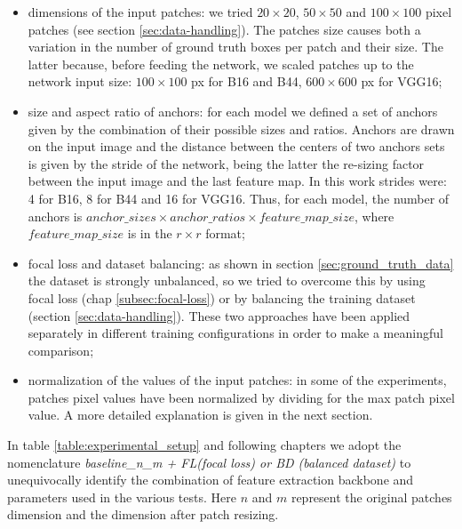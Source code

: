 \documentclass[a4paper,10pt]{report}
\begin{document}
\begin{itemize}
    \item dimensions of the input patches: we tried $20 \times 20$, $50 \times 50$ and $100 \times 100$ pixel patches (see section \ref{sec:data-handling}). The patches size causes both a variation in the number of ground truth boxes per patch and their size. The latter because, before feeding the network, we scaled patches up to the network input size: $100 \times 100 $ px for B16 and B44, $ 600 \times 600$ px for VGG16;
    \item size and aspect ratio of anchors: for each model we defined a set of anchors given by the combination of their possible sizes and ratios. Anchors are drawn on the input image and the distance between the centers of two anchors sets is given by the stride of the network, being the latter the re-sizing factor between the input image and the last feature map. In this work strides were: 4 for B16, 8 for B44 and 16 for VGG16. Thus, for each model, the number of anchors is $anchor\_sizes \times anchor\_ratios \times feature\_map\_size$, where $feature\_map\_size$ is in the $r \times r$ format;
    \item focal loss and dataset balancing: as shown in section \ref{sec:ground_truth_data} the dataset is strongly unbalanced, so we tried to overcome this by using focal loss (chap \ref{subsec:focal-loss}) or by balancing the training dataset (section \ref{sec:data-handling}). These two approaches have been applied separately in different training configurations in order to make a meaningful comparison;
    \item normalization of the values of the input patches: in some of the experiments, patches pixel values have been normalized by dividing for the max patch pixel value. A more detailed explanation is given in the next section.
\end{itemize}

In table \ref{table:experimental_setup} and following chapters we adopt the nomenclature \emph{baseline\_n\_m + FL(focal loss) or BD (balanced dataset)} to unequivocally identify the combination of feature extraction backbone and parameters used in the various tests. Here $n$ and $m$ represent the original patches dimension and the dimension after patch resizing.
\end{document}

